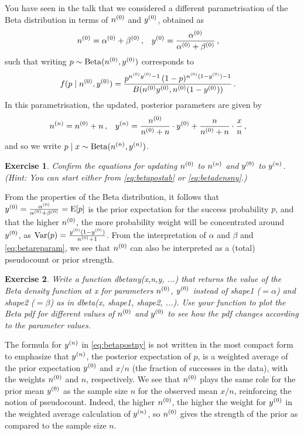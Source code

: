 \documentclass[12pt,a4paper	,twoside]{article}
\newcommand{\E}{\operatorname{E}}
\newcommand{\V}{\operatorname{Var}}
\newcommand{\be}{\operatorname{Beta}}
\newcommand{\code}[1]{\emph{\ttfamily #1}}
\newtheorem{myex}{Exercise}
\begin{document}
You have seen in the talk that we considered a different parametrisation of the Beta distribution
in terms of $n^{(0)}$ and $y^{(0)}$, obtained as
\begin{align}
n^{(0)} &= \alpha^{(0)} + \beta^{(0)}\,, & y^{(0)} &= \frac{\alpha^{(0)}}{\alpha^{(0)}+\beta^{(0)}}\,,
\label{eq:betareparam}
\end{align}
such that writing $p \sim \be(\nz,\yz)$ corresponds to
\begin{align}
f(p\mid n^{(0)},y^{(0)}) &= \frac{p^{n^{(0)}y^{(0)}-1}\, (1-p)^{n^{(0)}(1-y^{(0)})-1}}{B(n^{(0)}y^{(0)},n^{(0)}(1-y^{(0)}))}\,.
\label{eq:betadensny}
\end{align}
In this parametrisation, the updated, posterior parameters are given by
\begin{align}
n^{(n)} &= n^{(0)} + n\,, &
y^{(n)} &= \frac{n^{(0)}}{n^{(0)} + n} \cdot y^{(0)} + \frac{n}{n^{(0)} + n} \cdot \frac{x}{n}\,,
\label{eq:betapostny}
\end{align}
and so we write $p\mid x \sim \be(\nn,\yn)$.

\begin{myex}
Confirm the equations for updating $n^{(0)}$ to $n^{(n)}$ and $y^{(0)}$ to $y^{(n)}$.
(Hint: You can start either from \eqref{eq:betapostab} or \eqref{eq:betadensny}.)
\end{myex}

From the properties of the Beta distribution,
it follows that $\yz = \frac{\az}{\az+\bz} = \E[p]$
is the prior expectation for the success probability $p$,
and that the higher $n^{(0)}$, the more probability weight will be concentrated around $y^{(0)}$,
as $\V(p) = \frac{\yz (1-\yz)}{\nz + 1}$.
From the interpretation of $\alpha$ and $\beta$ and \eqref{eq:betareparam},
we see that $n^{(0)}$ can also be interpreted as a (total) pseudocount or prior strength.

\begin{myex}
Write a function \code{dbetany(x,n,y, ...)}
that returns the value of the Beta density function at \code{x}
for parameters $n^{(0)}$, $y^{(0)}$ instead of \code{shape1} ($=\alpha$) and \code{shape2} ($=\beta$)
as in \code{dbeta(x, shape1, shape2, ...)}.
Use your function to plot the Beta pdf for different values of $n^{(0)}$ and $y^{(0)}$
to see how the pdf changes according to the parameter values.
\end{myex}

The formula for $y^{(n)}$ in \eqref{eq:betapostny} is not written in the most compact form
to emphasize that $y^{(n)}$, the posterior expectation of $p$,
is a weighted average of the prior expectation $y^{(0)}$ and $x/n$ (the fraction of successes in the data),
with the weights $n^{(0)}$ and $n$, respectively.
We see that $n^{(0)}$ plays the same role for the prior mean $y^{(0)}$
as the sample size $n$ for the observed mean $x/n$,
reinforcing the notion of pseudocount.
Indeed, the higher $n^{(0)}$, the higher the weight for $y^{(0)}$
in the weighted average calculation of $y^{(n)}$,
so $n^{(0)}$ gives the strength of the prior as compared to the sample size $n$.
\end{document}
